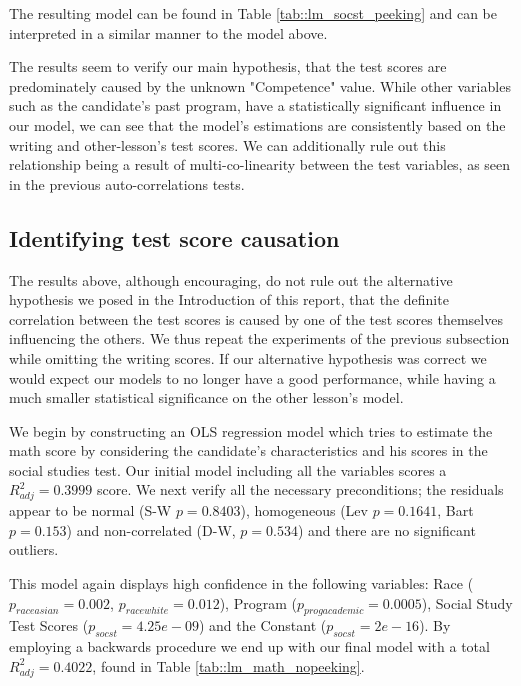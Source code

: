 \documentclass[10pt, a4paper]{article}
\begin{document}
	The resulting model can be found in Table \ref{tab::lm_socst_peeking} and can be interpreted in a similar manner to the model above.
	
	The results seem to verify our main hypothesis, that the test scores are predominately caused by the unknown "Competence" value. While other variables such as the candidate's past program, have a statistically significant influence in our model, we can see that the model's estimations are consistently based on the writing and other-lesson's test scores. We can additionally rule out this relationship being a result of multi-co-linearity between the test variables, as seen in the previous auto-correlations tests.
	
	
	
	
	
	\subsection{Identifying test score causation}
	
	The results above, although encouraging, do not rule out the alternative hypothesis we posed in the Introduction of this report, that the definite correlation between the test scores is caused by one of the test scores themselves influencing the others. We thus repeat the experiments of the previous subsection while omitting the writing scores. If our alternative hypothesis was correct we would expect our models to no longer have a good performance, while having a much smaller statistical significance on the other lesson's model.
	
	We begin by constructing an OLS regression model which tries to estimate the math score by considering the candidate's characteristics and his scores in the social studies test. Our initial model including all the variables scores a $R^2_{adj} = 0.3999$ score. We next verify all the necessary preconditions; the residuals appear to be normal (S-W $p = 0.8403$), homogeneous (Lev $p = 0.1641$, Bart $p = 0.153$) and non-correlated (D-W, $p=0.534$) and there are no significant outliers. 
	
	This model again displays high confidence in the following variables: Race ($p_{raceasian} = 0.002$, $p_{racewhite} = 0.012$), Program ($p_{progacademic} = 0.0005$), Social Study Test Scores ($p_{socst} = 4.25e-09$) and the Constant ($p_{socst} = 2e-16$). By employing a backwards procedure we end up with our final model with a total $R^2_{adj} = 0.4022$, found in Table \ref{tab::lm_math_nopeeking}.
	
\end{document}
